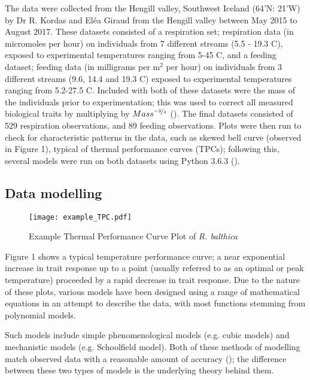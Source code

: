 \documentclass[../../Paper.tex]{subfiles}
\begin{document}
The data were collected from the Hengill valley, Southwest Iceland (64'N: 21'W) by Dr R. Kordas and El\'{e}a Giraud from the Hengill valley between May 2015 to August 2017.
These datasets consisted of a respiration set; respiration data (in micromoles per hour) on
individuals from 7 different streams (5.5 - 19.3 \degree C), exposed to experimental
temperatures ranging from 5-45 \degree C, and a feeding dataset; feeding data (in milligrams per m$^{2}$
per hour) on individuals from 3 different streams (9.6, 14.4 and 19.3 \degree C) exposed to experimental
temperatures ranging from 5.2-27.5 \degree C. Included with both of these datasets were the mass of 
the individuals prior to experimentation; this was used to correct all measured biological traits
by multiplying by $Mass^{\nicefrac{-3}{4}}$ (\cite{brown_toward_2004}). The final datasets consisted of 529 respiration observations, 
and 89 feeding observations. Plots were then run to check for characteristic patterns
in the data, such as skewed bell curve (observed in Figure 1), typical of thermal performance curves (TPCs); following this, several models were run on both datasets using Python 3.6.3 (\cite{van_rossum_python_2001}).

\subsection*{Data modelling}

\begin{figure}[H]
\texttt{[image: example\_TPC.pdf]}
\caption{Example Thermal Performance Curve Plot of \textit{R. balthica}}

\end{figure}

Figure 1 shows a typical temperature performance curve; a near exponential
increase in trait response up to a point (usually referred to as an optimal or peak temperature)
proceeded by a rapid decrease in trait response. Due to the nature of these plots, various models 
have been designed using a range of mathematical equations in an attempt to describe the data, 
with most functions stemming from polynomial models.

Such models include simple phenomenological models (e.g. cubic models) and 
mechanistic models (e.g. Schoolfield model). Both of these methods of modelling 
match observed data with a reasonable amount of accuracy (\cite{affinito_temperature_2017}); the difference between 
these two types of models is the underlying theory behind them. 
\end{document}
